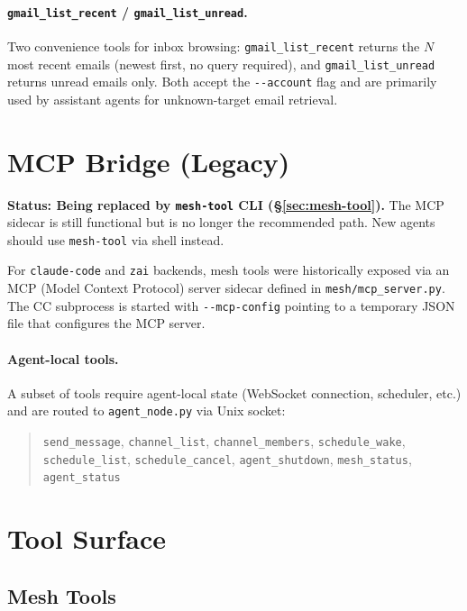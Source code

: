 \documentclass[11pt,letterpaper]{report}
\newcommand{\code}[1]{\texttt{#1}}
\begin{document}
\paragraph{\code{gmail\_list\_recent} / \code{gmail\_list\_unread}.}
Two convenience tools for inbox browsing:
\code{gmail\_list\_recent} returns the $N$ most recent emails (newest
first, no query required), and \code{gmail\_list\_unread} returns
unread emails only. Both accept the \code{-{}-account} flag and are
primarily used by assistant agents for unknown-target email retrieval.

\section{MCP Bridge (Legacy)}
\label{sec:mcp}

\textbf{Status: Being replaced by \code{mesh-tool} CLI
(\S\ref{sec:mesh-tool}).} The MCP sidecar is still functional but is no
longer the recommended path. New agents should use \code{mesh-tool} via
shell instead.

For \code{claude-code} and \code{zai} backends, mesh tools were
historically exposed via an MCP (Model Context Protocol) server sidecar
defined in \code{mesh/mcp\_server.py}. The CC subprocess is started with
\code{-{}-mcp-config} pointing to a temporary JSON file that configures
the MCP server.

\paragraph{Agent-local tools.}
A subset of tools require agent-local state (WebSocket connection,
scheduler, etc.) and are routed to \code{agent\_node.py} via Unix
socket:

\begin{quote}
\small
\code{send\_message}, \code{channel\_list}, \code{channel\_members},
\code{schedule\_wake}, \code{schedule\_list}, \code{schedule\_cancel},
\code{agent\_shutdown}, \code{mesh\_status}, \code{agent\_status}
\end{quote}

\section{Tool Surface}
\label{sec:tools}

\subsection{Mesh Tools}
\end{document}

